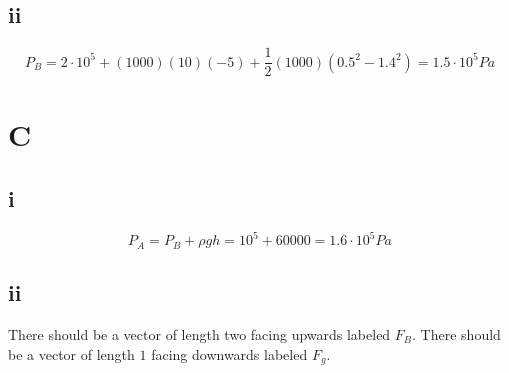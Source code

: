 \documentclass{article}
\begin{document}
\subsection{ii}

$$P_B = 2\cdot 10^5 + (1000)(10)(-5) + \frac{1}{2}(1000)(0.5^2-1.4^2) = 1.5\cdot 10^5 Pa$$

\section{C}

\subsection{i}

$$P_A = P_B + \rho gh = 10^5 + 60000 = 1.6 \cdot 10^5 Pa$$

\subsection{ii}

There should be a vector of length two facing upwards labeled $F_B$. There should be a vector of length $1$ facing downwards labeled $F_g$.
\end{document}
